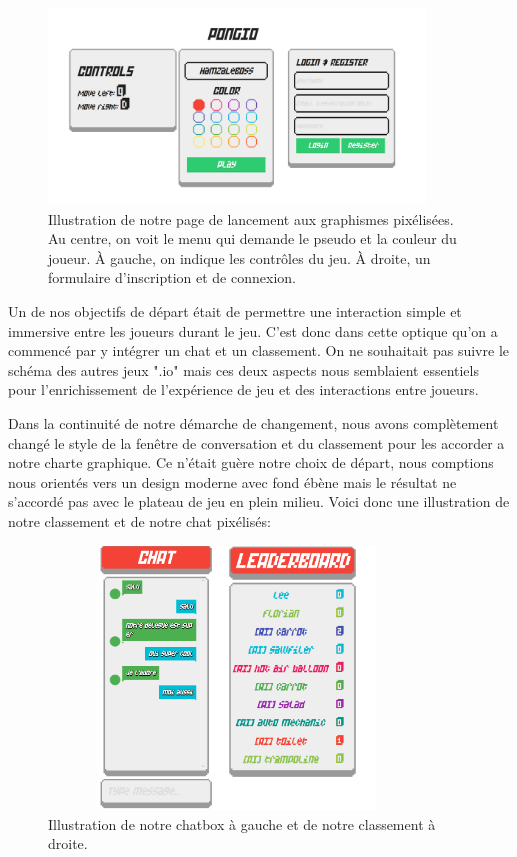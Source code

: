 \begin{figure}[H]
  \centering
  \includegraphics[width=10cm]{images/Capture3}
  \caption{Illustration de notre page de lancement aux graphismes pixélisées. Au centre, on voit le menu qui demande le pseudo et la couleur du joueur. À gauche, on indique les contrôles du jeu. À droite, un formulaire d'inscription et de connexion.}
  \label{fig:deux-image}
\end{figure}

Un de nos objectifs de départ était de permettre une interaction simple et immersive entre les joueurs durant le jeu. C'est donc dans cette optique qu'on a commencé par y intégrer un chat et un classement. On ne souhaitait pas suivre le schéma des autres jeux ".io" mais ces deux aspects nous semblaient essentiels pour l'enrichissement de l'expérience de jeu et des interactions entre joueurs.


Dans la continuité de notre démarche de changement, nous avons complètement changé le style de la fenêtre de conversation et du classement pour les accorder a notre charte graphique. Ce n'était guère notre choix de départ, nous comptions nous orientés vers un design moderne avec fond ébène mais le résultat ne s'accordé pas avec le plateau de jeu en plein milieu. Voici donc une illustration de notre classement et de notre chat pixélisés:

\begin{figure}[H]
  \centering
  \includegraphics[width=10cm,height=7cm]{images/Capture6}
  \caption{Illustration de notre chatbox à gauche et de notre classement à droite.}
  \label{fig:trois-image}
\end{figure}

